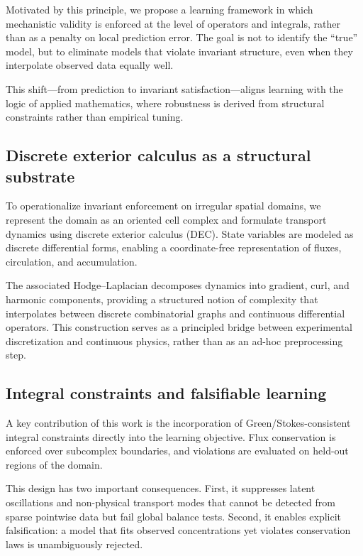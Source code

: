 \documentclass[10pt,article]{article}
\begin{document}
Motivated by this principle, we propose a learning framework in which mechanistic validity is enforced at the level of operators and integrals, rather than as a penalty on local prediction error. The goal is not to identify the “true” model, but to eliminate models that violate invariant structure, even when they interpolate observed data equally well.

This shift—from prediction to invariant satisfaction—aligns learning with the logic of applied mathematics, where robustness is derived from structural constraints rather than empirical tuning.

\subsection{Discrete exterior calculus as a structural substrate}

To operationalize invariant enforcement on irregular spatial domains, we represent the domain as an oriented cell complex and formulate transport dynamics using discrete exterior calculus (DEC). State variables are modeled as discrete differential forms, enabling a coordinate-free representation of fluxes, circulation, and accumulation.

The associated Hodge–Laplacian decomposes dynamics into gradient, curl, and harmonic components, providing a structured notion of complexity that interpolates between discrete combinatorial graphs and continuous differential operators. This construction serves as a principled bridge between experimental discretization and continuous physics, rather than as an ad-hoc preprocessing step.

\subsection{Integral constraints and falsifiable learning}

A key contribution of this work is the incorporation of Green/Stokes-consistent integral constraints directly into the learning objective. Flux conservation is enforced over subcomplex boundaries, and violations are evaluated on held-out regions of the domain.

This design has two important consequences. First, it suppresses latent oscillations and non-physical transport modes that cannot be detected from sparse pointwise data but fail global balance tests. Second, it enables explicit falsification: a model that fits observed concentrations yet violates conservation laws is unambiguously rejected.
\end{document}

